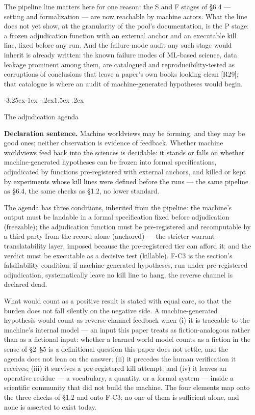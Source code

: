 \documentclass[11pt,a4paper]{article}
\makeatletter
\renewcommand\subsection{\@startsection{subsection}{2}{\z@}%
  {-3.25ex\@plus -1ex \@minus -.2ex}{1.5ex \@plus .2ex}%
  {\normalfont\large\bfseries\raggedright}}
\makeatother
\begin{document}
The pipeline line matters here for one reason: the S and F stages of §6.4 — setting and formalization — are now reachable by machine actors. What the line does not yet show, at the granularity of the pool's documentation, is the P stage: a frozen adjudication function with an external anchor and an executable kill line, fixed before any run. And the failure-mode audit any such stage would inherit is already written: the known failure modes of ML-based science, data leakage prominent among them, are catalogued and reproducibility-tested as corruptions of conclusions that leave a paper's own books looking clean [R29]; that catalogue is where an audit of machine-generated hypotheses would begin.

\subsection{The adjudication agenda}

\textbf{Declaration sentence.} Machine worldviews may be forming, and they may be good ones; neither observation is evidence of feedback. Whether machine worldviews feed back into the sciences is decidable: it stands or falls on whether machine-generated hypotheses can be frozen into formal specifications, adjudicated by functions pre-registered with external anchors, and killed or kept by experiments whose kill lines were defined before the runs — the same pipeline as §6.4, the same checks as §1.2, no lower standard.

The agenda has three conditions, inherited from the pipeline: the machine's output must be landable in a formal specification fixed before adjudication (freezable); the adjudication function must be pre-registered and recomputable by a third party from the record alone (anchored) — the stricter warrant-translatability layer, imposed because the pre-registered tier can afford it; and the verdict must be executable as a decisive test (killable). F-C3 is the section's falsifiability condition: if machine-generated hypotheses, run under pre-registered adjudication, systematically leave no kill line to hang, the reverse channel is declared dead.

What would count as a positive result is stated with equal care, so that the burden does not fall silently on the negative side. A machine-generated hypothesis would count as reverse-channel feedback when (i) it is traceable to the machine's internal model — an input this paper treats as fiction-analogous rather than as a fictional input: whether a learned world model counts as a fiction in the sense of §2–§5 is a definitional question this paper does not settle, and the agenda does not lean on the answer; (ii) it precedes the human verification it receives; (iii) it survives a pre-registered kill attempt; and (iv) it leaves an operative residue — a vocabulary, a quantity, or a formal system — inside a scientific community that did not build the machine. The four elements map onto the three checks of §1.2 and onto F-C3; no one of them is sufficient alone, and none is asserted to exist today.
\end{document}
